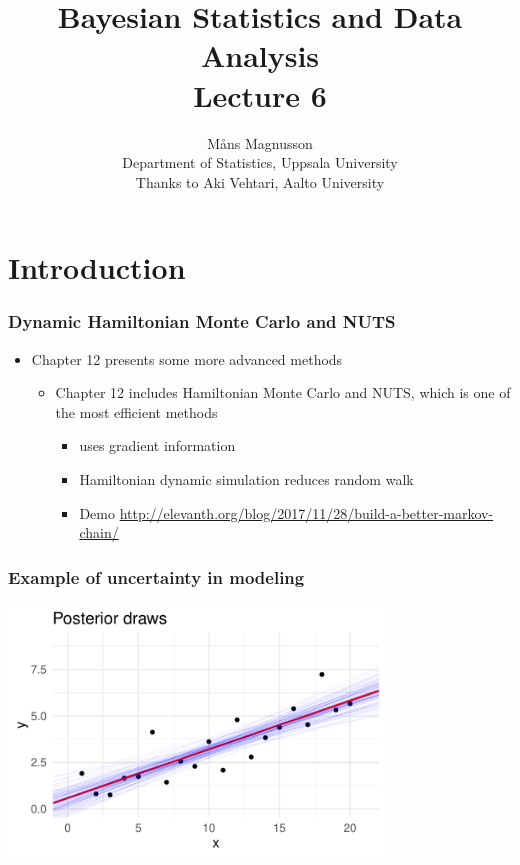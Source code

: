 \documentclass[10pt,handout]{beamer}
\title[]{{\color{black}Bayesian Statistics and Data Analysis \\ Lecture 6}}
\author[]{M{\aa}ns Magnusson \\ Department of Statistics, Uppsala University \\ Thanks to Aki Vehtari, Aalto University}
\date{}
\begin{document}
\frame{\titlepage
}



\section{Introduction}
\frame{\sectionpage}


\begin{frame}

\frametitle{ Dynamic Hamiltonian Monte Carlo and NUTS}

  \begin{itemize}
  \item Chapter 12 presents some more advanced methods
    \begin{itemize}
    \item Chapter 12 includes Hamiltonian Monte Carlo and NUTS, which
      is one of the most efficient methods
      \begin{itemize}
      \item uses gradient information
      \item Hamiltonian dynamic simulation reduces random walk
   \item Demo {\small \url{http://elevanth.org/blog/2017/11/28/build-a-better-markov-chain/}}
      \end{itemize}
    \end{itemize}
  \end{itemize}

\end{frame}

\begin{frame}

\frametitle{ Example of uncertainty in modeling}

  \includegraphics[width=10cm]{figs/fakel_postdraws.pdf}

\end{frame}
\end{document}
